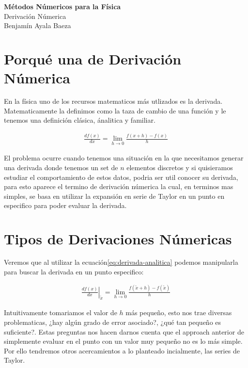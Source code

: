 \documentclass[twoside]{article}
\begin{document}
\thispagestyle{plainfirst}

\begin{tcolorbox}[portada]
    \centering
    {\Huge \bfseries Métodos Númericos para la Física}\\[0.5cm]
    {\LARGE Derivación Númerica}\\[0.5cm]
    {\large Benjamín Ayala Baeza}
\end{tcolorbox}



\section{Porqué una de Derivación Númerica}

En la física uno de los recursos matematicos más utlizados es la derivada. Matematicamente la definimos como la taza de cambio de una función
y le tenemos una definición clásica, ánalitica y familiar. 

  \begin{align}
    \frac{d f(x)}{dx} = \lim_{h \rightarrow 0} \frac{f(x+h)- f(x)}{h} \label{eq:derivada-analitica}
  \end{align}

El problema ocurre cuando tenemos una situación en la que necesitamos generar una derivada donde tenemos un set de $n$ elementos 
discretos y si quisieramos estudiar el comportamiento de estos datos, podria ser util conocer su derivada, para esto aparece el termino
de derivación númerica la cual, en terminos mas simples, se basa en utilizar la expansión en serie de Taylor en un punto en
especifico para poder evaluar la derivada. 

\section{Tipos de Derivaciones Númericas}
Veremos que al utilizar la ecuación\eqref{eq:derivada-analitica} podemos manipularla para buscar la derivada en un punto especifico:

  \begin{align*}
    \left. \frac{d f(x)}{dx} \right|_{\tilde{x}} = \lim_{h \rightarrow 0} \frac{f(\tilde{x}+h)- f(\tilde{x})}{h} 
  \end{align*}

Intuitivamente tomariamos el valor de $h$ más pequeño, esto nos trae diversas problematicas, 
¿hay algún grado de error asociado?, ¿qué tan pequeño es suficiente?. Estas preguntas nos hacen darnos cuenta
que el approach anterior de simplemente evaluar en el punto con un valor muy pequeño no es lo más simple. \\
Por ello tendremos otros acercamientos a lo planteado incialmente, las series de Taylor.
\end{document}

